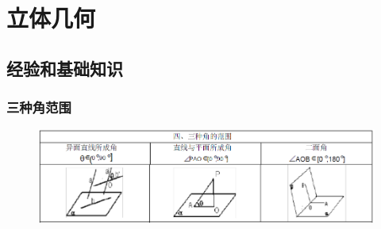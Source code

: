 \documentclass[hyperref, UTF8,11pt,a4paper]{ctexart} %
\begin{document}
\newpage
\section{立体几何}

\subsection{经验和基础知识}

\subsubsection{三种角范围}
\begin{figure}[!h] %
	\centering
	\includegraphics[width=450pt]  {pic/litijihe/szjfw.png} \\

\end{figure}
\end{document}
